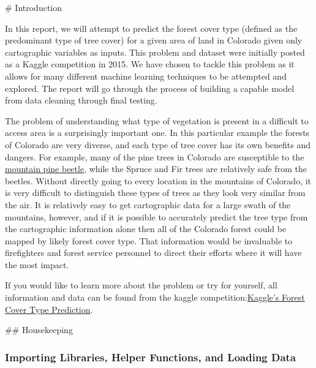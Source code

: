 \documentclass[11pt]{article}
\begin{document}
     \# Introduction

    In this report, we will attempt to predict the forest cover type
(defined as the predominant type of tree cover) for a given area of land
in Colorado given only cartographic variables as inputs. This problem
and dataset were initially posted as a Kaggle competition in 2015. We
have chosen to tackle this problem as it allows for many different
machine learning techniques to be attempted and explored. The report
will go through the process of building a capable model from data
cleaning through final testing.

The problem of understanding what type of vegetation is present in a
difficult to access area is a surprisingly important one. In this
particular example the forests of Colorado are very diverse, and each
type of tree cover has its own benefits and dangers. For example, many
of the pine trees in Colorado are susceptible to the
\href{https://csfs.colostate.edu/forest-management/common-forest-insects-diseases/mountain-pine-beetle/}{mountain
pine beetle}, while the Spruce and Fir trees are relatively safe from
the beetles. Without directly going to every location in the mountains
of Colorado, it is very difficult to distinguish these types of trees as
they look very similar from the air. It is relatively easy to get
cartographic data for a large swath of the mountains, however, and if it
is possible to accurately predict the tree type from the cartographic
information alone then all of the Colorado forest could be mapped by
likely forest cover type. That information would be invaluable to
firefighters and forest service personnel to direct their efforts where
it will have the most impact.

If you would like to learn more about the problem or try for yourself,
all information and data can be found from the kaggle
competition:\href{https://www.kaggle.com/c/forest-cover-type-prediction}{Kaggle's
Forest Cover Type Prediction}.

     \#\# Housekeeping

    \subsubsection{Importing Libraries, Helper Functions, and Loading
Data}\label{importing-libraries-helper-functions-and-loading-data}
\end{document}
